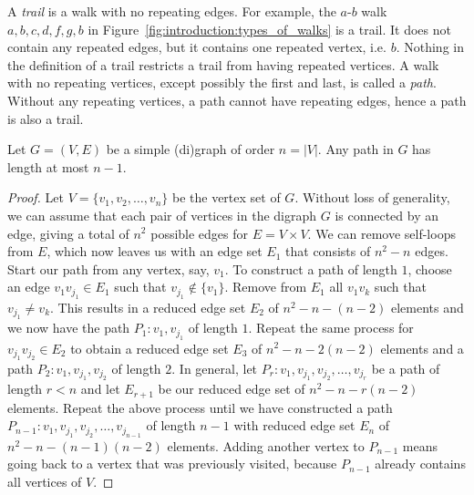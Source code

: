 A \emph{trail} is a walk with no repeating edges. For
example, the $a$-$b$ walk $a, b, c, d, f, g, b$ in
Figure~\ref{fig:introduction:types_of_walks} is a trail. It does not
contain any repeated edges, but it contains one repeated vertex,
i.e. $b$. Nothing in the definition of a trail restricts a trail from
having repeated vertices. A walk with no repeating vertices, except
possibly the first and last, is called a \emph{path}.
Without any repeating vertices, a path cannot have repeating edges,
hence a path is also a trail.

\begin{proposition}
\label{prop:introduction:any_path_has_length_at_most_n_minus_1}
Let $G = (V, E)$ be a simple (di)graph of order $n = |V|$. Any path in $G$
has length at most $n - 1$.
\end{proposition}

\begin{proof}
Let $V = \{v_1, v_2, \dots, v_n\}$ be the vertex set of $G$. Without
loss of generality, we can assume that each pair of vertices in
the digraph $G$ is connected by an edge, giving a total of $n^2$
possible edges for $E = V \times V$. We can remove self-loops from
$E$, which now leaves us with an edge set $E_1$ that consists of
$n^2 - n$ edges. Start our path from any vertex, say, $v_1$. To
construct a path of length $1$, choose an edge $v_1 v_{j_1} \in E_1$
such that $v_{j_1} \notin \{v_1\}$. Remove from $E_1$ all $v_1 v_k$
such that $v_{j_1} \neq v_k$. This results in a reduced edge set $E_2$
of $n^2 - n - (n - 2)$ elements and we now have the path
$P_1: v_1, v_{j_1}$ of length $1$. Repeat the same process for
$v_{j_1} v_{j_2} \in E_2$ to obtain a reduced edge set $E_3$ of
$n^2 - n - 2(n - 2)$ elements and a path $P_2: v_1, v_{j_1}, v_{j_2}$
of length $2$. In general, let
$P_r: v_1, v_{j_1}, v_{j_2}, \dots, v_{j_r}$ be a path of length
$r < n$ and let $E_{r+1}$ be our reduced edge set of
$n^2 - n - r(n - 2)$ elements. Repeat the above process until we have
constructed a path
$P_{n-1}: v_1, v_{j_1}, v_{j_2}, \dots, v_{j_{n-1}}$ of length $n - 1$
with reduced edge set $E_n$ of $n^2 - n - (n - 1)(n - 2)$
elements. Adding another vertex to $P_{n-1}$ means going back to a
vertex that was previously visited, because $P_{n-1}$ already contains
all vertices of $V$.
\end{proof}

